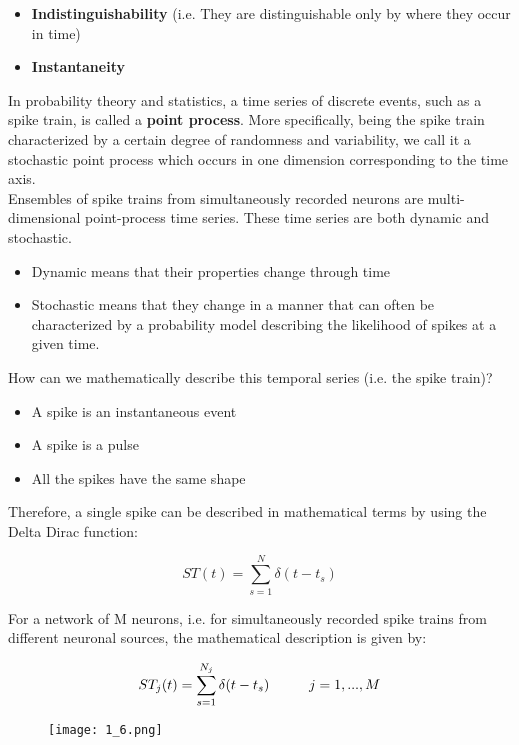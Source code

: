 \begin{itemize}
    \item \textbf{Indistinguishability} (i.e. They are distinguishable 
only by where they occur in time)
    \item \textbf{Instantaneity} 
\end{itemize}

In probability theory and statistics, a time series of discrete events, 
such as a spike train, is called a \textbf{point process}. More 
specifically, being the spike train characterized by a certain degree of 
randomness and variability, we call it a stochastic point process which 
occurs in one dimension corresponding to the time axis. \\
Ensembles of spike trains from simultaneously recorded neurons are multi- 
dimensional point-process time series. These time series are both dynamic 
and stochastic. 

\begin{itemize}
    \item Dynamic means that their properties change through time
    \item Stochastic means that they change in a manner that can often be 
characterized by a probability model describing the likelihood of spikes 
at a given time. 
\end{itemize}

How can we mathematically describe this temporal series (i.e. the spike 
train)? 

\begin{itemize}
    \item A spike is an instantaneous event
    \item A spike is a pulse
    \item All the spikes have the same shape
\end{itemize}

Therefore, a single spike can be described in mathematical terms by using 
the Delta Dirac function:

\begin{equation*}
    ST(t) = \sum_{s=1}^N\delta(t-t_s)
\end{equation*}

For a network of M neurons, i.e. for simultaneously recorded spike trains 
from different neuronal sources, the mathematical description is given by:

\begin{equation*}
    ST_j(t) = \sum_{s=1}^{N_j}\delta(t-t_s) \hspace{1 cm} j=1, ..., M
\end{equation*}

 \begin{figure}[h]
    \centering
    \texttt{[image: 1\_6.png]}
\end{figure}
\newpage
